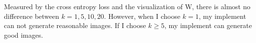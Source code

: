 \documentclass[twoside]{article}
\begin{document}
\begin{figure}[h]
\centering
{}
\end{figure}
Measured by the cross entropy loss and the visualization of W, there is almost no difference between $k=1,5,10,20$. However, when I choose $k=1$, my implement can not generate reasonable images. If I choose $k \geq 5$, my implement can generate good images.
\end{document}
